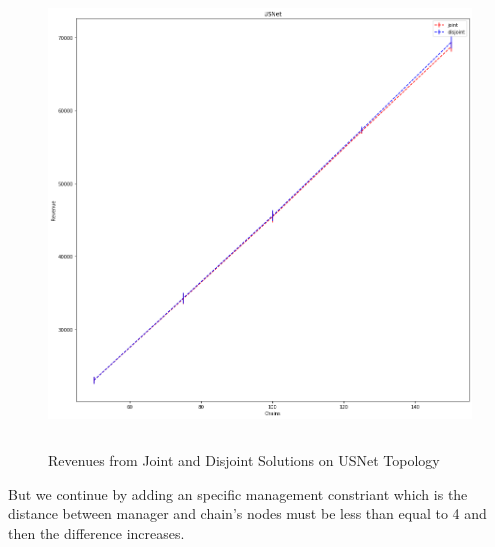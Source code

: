 \begin{figure}[H]
    \centering
    \includegraphics[height=350pt]{plots/joint-vs-disjoint-usnet-1.png}
    \caption{Revenues from Joint and Disjoint Solutions on USNet Topology}
    \label{fig:joint-vs-disjoint-usnet-1}
\end{figure}

But we continue by adding an specific management constriant which is the distance between manager and chain's nodes must be less than equal to 4 and then the difference increases.


